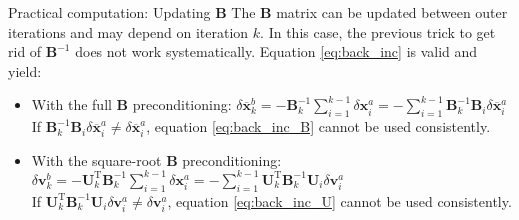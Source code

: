 \documentclass[8pt]{beamer}
\begin{document}
\begin{frame}{Practical computation: Updating $\mathbf{B}$}
The $\mathbf{B}$ matrix can be updated between outer iterations and may depend on iteration $k$. In this case, the previous trick to get rid of $\mathbf{B}^{-1}$ does not work systematically. Equation \eqref{eq:back_inc} is valid and yield:
\vspace{+0.3cm}
\begin{itemize}
\item With the full $\mathbf{B}$ preconditioning: $\delta \overline{\mathbf{x}}^b_k = - \mathbf{B}_k^{-1}\sum_{i=1}^{k-1} \delta \mathbf{x}^a_i \nonumber = - \sum_{i=1}^{k-1} \mathbf{B}_k^{-1} \mathbf{B}_i \delta \overline{\mathbf{x}}^a_i$\\
\vspace{+0.2cm}
If $\mathbf{B}_k^{-1} \mathbf{B}_i \delta \overline{\mathbf{x}}^a_i \ne \delta \overline{\mathbf{x}}^a_i$, equation \eqref{eq:back_inc_B} cannot be used consistently.
\vspace{+0.3cm}
\item With the square-root $\mathbf{B}$ preconditioning: $\delta \mathbf{v}^b_k = - \mathbf{U}_k^\mathrm{T} \mathbf{B}_k^{-1} \sum_{i=1}^{k-1} \delta \mathbf{x}^a_i = - \sum_{i=1}^{k-1} \mathbf{U}_k^\mathrm{T} \mathbf{B}_k^{-1} \mathbf{U}_i \delta \mathbf{v}^a_i$\\
\vspace{+0.2cm}
If $\mathbf{U}_k^\mathrm{T} \mathbf{B}_k^{-1} \mathbf{U}_i \delta \mathbf{v}^a_i \ne \delta \mathbf{v}^a_i$, equation \eqref{eq:back_inc_U} cannot be used consistently.
\end{itemize}
\end{frame}
\end{document}
